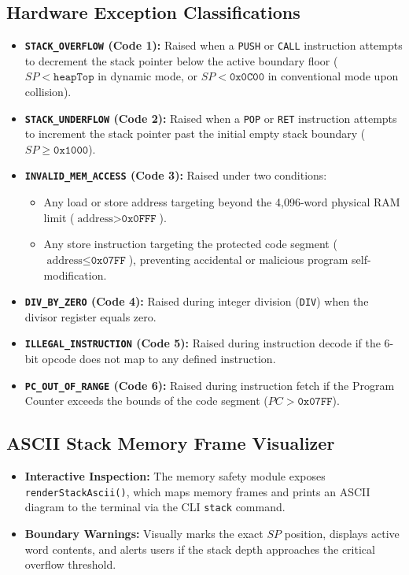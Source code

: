 \documentclass[11pt,a4paper]{article}
\begin{document}
\subsection{Hardware Exception Classifications}
\begin{itemize}
    \item \textbf{\texttt{STACK\_OVERFLOW} (Code 1):} Raised when a \texttt{PUSH} or \texttt{CALL} instruction attempts to decrement the stack pointer below the active boundary floor ($SP < \texttt{heapTop}$ in dynamic mode, or $SP < \texttt{0x0C00}$ in conventional mode upon collision).
    \item \textbf{\texttt{STACK\_UNDERFLOW} (Code 2):} Raised when a \texttt{POP} or \texttt{RET} instruction attempts to increment the stack pointer past the initial empty stack boundary ($SP \ge \texttt{0x1000}$).
    \item \textbf{\texttt{INVALID\_MEM\_ACCESS} (Code 3):} Raised under two conditions:
    \begin{itemize}
        \item Any load or store address targeting beyond the 4,096-word physical RAM limit ($\text{address} > \texttt{0x0FFF}$).
        \item Any store instruction targeting the protected code segment ($\text{address} \le \texttt{0x07FF}$), preventing accidental or malicious program self-modification.
    \end{itemize}
    \item \textbf{\texttt{DIV\_BY\_ZERO} (Code 4):} Raised during integer division (\texttt{DIV}) when the divisor register equals zero.
    \item \textbf{\texttt{ILLEGAL\_INSTRUCTION} (Code 5):} Raised during instruction decode if the 6-bit opcode does not map to any defined instruction.
    \item \textbf{\texttt{PC\_OUT\_OF\_RANGE} (Code 6):} Raised during instruction fetch if the Program Counter exceeds the bounds of the code segment ($PC > \texttt{0x07FF}$).
\end{itemize}

\subsection{ASCII Stack Memory Frame Visualizer}
\begin{itemize}
    \item \textbf{Interactive Inspection:} The memory safety module exposes \texttt{renderStackAscii()}, which maps memory frames and prints an ASCII diagram to the terminal via the CLI \texttt{stack} command.
    \item \textbf{Boundary Warnings:} Visually marks the exact $SP$ position, displays active word contents, and alerts users if the stack depth approaches the critical overflow threshold.
\end{itemize}
\end{document}
